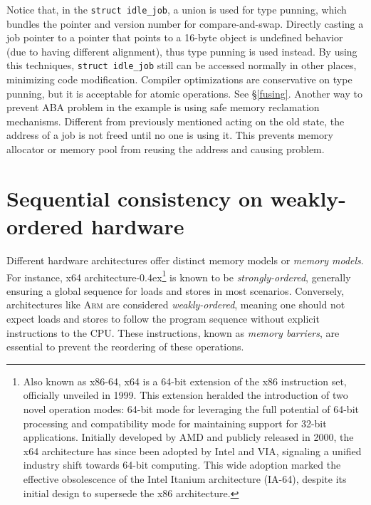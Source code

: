 \documentclass[fontsize=10pt, oneside]{scrartcl}
\newcommand{\punckern}{\kern-0.4ex}
\newcommand{\monobox}[1]{\mbox{\texttt{#1}}}
\newcommand{\introduce}[1]{\textit{#1}}
\newcommand{\secref}[1]{\hyperref[#1]{\textsc{\S}\ref*{#1}}}
\begin{document}
\inputminted{c}{./examples/rmw_example_aba.c}

Notice that, in the \monobox{struct idle\_job}, a union is used for type punning, which bundles the pointer and version number for compare-and-swap.
Directly casting a job pointer to a pointer that points to a 16-byte object is undefined behavior (due to having different alignment), thus type punning is used instead.
By using this techniques, \monobox{struct idle\_job} still can be accessed normally in other places, minimizing code modification.
Compiler optimizations are conservative on type punning, but it is acceptable for atomic operations.
See \secref{fusing}.
Another way to prevent ABA problem in the example is using safe memory reclamation mechanisms.
Different from previously mentioned acting on the old state, the address of a job is not freed until no one is using it.
This prevents memory allocator or memory pool from reusing the address and causing problem.

\section{Sequential consistency on weakly-ordered hardware}

Different hardware architectures offer distinct memory models or \introduce{memory models}.
For instance, x64 architecture\punckern\footnote{%
Also known as x86-64, x64 is a 64-bit extension of the x86 instruction set, officially unveiled in 1999.
This extension heralded the introduction of two novel operation modes:
64-bit mode for leveraging the full potential of 64-bit processing and compatibility mode for maintaining support for 32-bit applications.
Initially developed by AMD and publicly released in 2000, the x64 architecture has since been adopted by Intel and VIA,
signaling a unified industry shift towards 64-bit computing.
This wide adoption marked the effective obsolescence of the Intel Itanium architecture (IA-64),
despite its initial design to supersede the x86 architecture.
} is known to be \introduce{strongly-ordered},
generally ensuring a global sequence for loads and stores in most scenarios.
Conversely, architectures like \textsc{Arm} are considered \introduce{weakly-ordered},
meaning one should not expect loads and stores to follow the program sequence without explicit instructions to the \textsc{CPU}.
These instructions, known as \introduce{memory barriers}, are essential to prevent the reordering of these operations.
\end{document}
